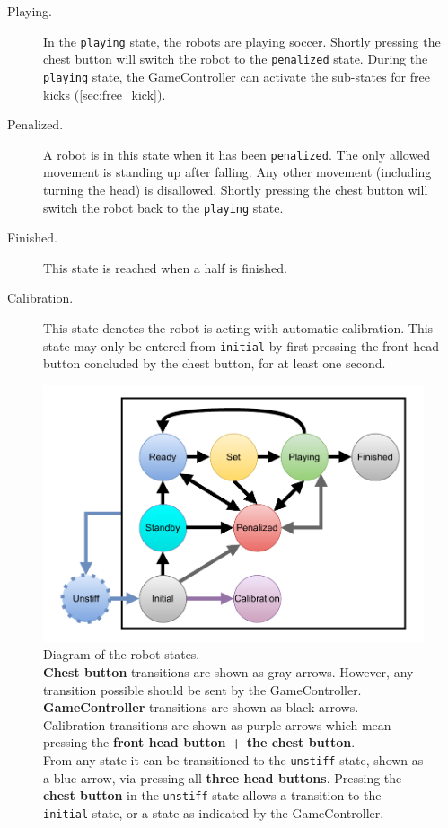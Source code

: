 \begin{description}
  \item[Playing.] In the \texttt{playing} state, the robots are playing soccer.
    Shortly pressing the chest button will switch the robot to the \texttt{penalized} state.
    During the \texttt{playing} state, the GameController can activate the sub-states for free kicks (\cf \cref{sec:free_kick}).

  \item[Penalized.] A robot is in this state when it has been \texttt{penalized}.
    The only allowed movement is standing up after falling.
    Any other movement (including turning the head) is disallowed.
    Shortly pressing the chest button will switch the robot back to the \texttt{playing} state.

  \item[Finished.] This state is reached when a half is finished.

  \item[Calibration.] This state denotes the robot is acting with automatic calibration.
    This state may only be entered from \texttt{initial} by first pressing the front head button concluded by the chest button, for at least one second.
\end{description}

\begin{figure}[t]
  \centerline{\includegraphics[width=0.9\columnwidth]{figs/states_new.pdf}}
  \caption{Diagram of the robot states.
    \\\textbf{Chest button} transitions are shown as gray arrows.
    However, any transition possible should be sent by the GameController.
    \\\textbf{GameController} transitions are shown as black arrows.
    \\Calibration transitions are shown as purple arrows which mean pressing the \textbf{front head button + the chest button}.
    \\From any state it can be transitioned to the \texttt{unstiff} state, shown as a blue arrow, via pressing all \textbf{three head buttons}.
    Pressing the \textbf{chest button} in the \texttt{unstiff} state allows a transition to the \texttt{initial} state, or a state as indicated by the GameController.}
  \label{fig:robot_states}
\end{figure}

